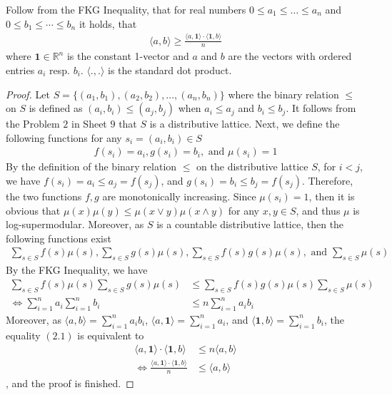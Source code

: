 \begin{problem}
  Follow from the FKG Inequality, that for real numbers $0 \leq a_{1} \leq \ldots \leq a_{n}$ and $0 \leq b_{1} \leq \cdots \leq b_{n}$ it holds, that
  \begin{align*}
    \langle a,b \rangle \geq \frac{\langle a,\textbf{1} \rangle \cdot \langle \textbf{1},b \rangle}{n}
  \end{align*}
  where $\textbf{1} \in \mathbb{R}^{n}$ is the constant 1-vector and $a$ and $b$ are the vectors with ordered entries $a_{i}$ resp. $b_{i}$. $\langle .,. \rangle$ is the standard dot product.
\end{problem}
\begin{proof}
  Let $S = \{(a_{1},b_{1}), (a_{2},b_{2}), \ldots, (a_{n},b_{n})\}$ where the binary relation $\leq$ on $S$ is defined as $(a_{i},b_{i}) \leq (a_{j},b_{j})$ when $a_{i} \leq a_{j}$ and $b_{i} \leq b_{j}$. It follows from the Problem $2$ in Sheet $9$ that $S$ is a distributive lattice. Next, we define the following functions for any $s_{i} = (a_{i}, b_{i}) \in S$
  \begin{align*}
    f(s_{i}) = a_{i}, g(s_{i}) = b_{i}, \text{ and } \mu(s_{i}) = 1
  \end{align*}
  By the definition of the binary relation $\leq$ on the distributive lattice $S$, for $i < j$, we have $f(s_{i}) = a_{i} \leq a_{j} = f(s_{j})$, and $g(s_{i}) = b_{i} \leq b_{j} = f(s_{j})$. Therefore, the two functions $f,g$ are monotonically increasing. Since $\mu(s_{i})=1$, then it is obvious that $\mu(x)\mu(y) \leq \mu(x \vee y) \mu(x \wedge y)$ for any $x,y \in S$, and thus $\mu$ is log-supermodular. Moreover, as $S$ is a countable distributive lattice, then the following functions exist
  \begin{align*}
    \sum\limits_{s \in S}f(s)\mu(s), \sum\limits_{s \in S}g(s)\mu(s), \sum\limits_{s \in S} f(s)g(s)\mu(s), \text{ and }\sum\limits_{s \in S} \mu(s)
  \end{align*}
  By the FKG Inequality, we have
  \begin{align*}
    \sum\limits_{s \in S}f(s)\mu(s) \sum\limits_{s \in S}g(s)\mu(s) &\leq \sum\limits_{s \in S} f(s)g(s)\mu(s) \sum\limits_{s \in S} \mu(s) \\
    \Leftrightarrow \sum\limits_{i=1}^{n} a_{i} \sum\limits_{i=1}^{n} b_{i} &\leq n \sum\limits_{i=1}^{n} a_{i}b_{i} \tag{2.1}
  \end{align*}
  Moreover, as $\langle a,b \rangle = \sum\limits_{i=1}^{n} a_{i}b_{i}$, $\langle a,\textbf{1} \rangle = \sum\limits_{i=1}^{n} a_{i}$, and $\langle \textbf{1},b \rangle = \sum\limits_{i=1}^{n} b_{i}$, the equality $(2.1)$ is equivalent to
  \begin{align*}
    \langle a,\textbf{1} \rangle \cdot \langle \textbf{1},b \rangle &\leq n \langle a,b \rangle \\
    \Leftrightarrow \frac{\langle a,\textbf{1} \rangle \cdot \langle \textbf{1},b \rangle}{n} &\leq \langle a,b \rangle
  \end{align*}
  , and the proof is finished.
\end{proof}

